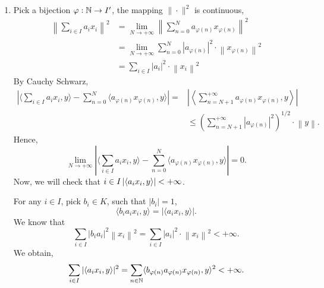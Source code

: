 \begin{proofenv}
\begin{enumerate}
        \quad Let $\psi: \NN \rightarrow I'$ be another bijection. 
        For any $N\in \NN$, there exists $M\in \NN$ such that
        $$ \{\varphi(0),\cdots \varphi(N)\}\subseteq \{\psi(0), \cdots \psi(M) \},\ M \coloneq \max\{\psi^{-1} \left(\varphi(i)\right)\}.$$
        equivalently,
        $$\{\psi(n)\mid  b\ge M + 1 \}\subseteq \{\varphi(m) \mid n\ge N + 1\}.$$
        Therefore, 
        $$ \left\| x - \sum_{n = 0}^{M} a_{\psi(n)} x_{\psi(n)}\right\|^2 = \sum_{n = M + 1}^{\infty} |a_{\psi(n)}|^2 \|x_{\psi(n)}\|^2\le \sum_{n = N + 1}^{+\infty} |a_{\varphi(n)}|^2 \|x_{\varphi(n)}\|^2,$$
        which gives
        $$ \lim_{M\rightarrow +\infty} \left\| x - \sum_{n = 0}^{M} a_{\psi(n)} x_{\psi(n)}\right\|^2 = 0.$$
        \item Pick a bijection $\varphi : \mathbb{N}\rightarrow I'$, the mapping $\|\cdot\|^2$ is continuous,
        $$ \begin{aligned}
            \left\| \sum_{i\in I} a_i x_i\right\|^2 &= \lim_{N\rightarrow +\infty} \left\| \sum_{n = 0}^{N} a_{\varphi(n)} x_{\varphi(n)}\right\|^2\\
            & = \lim_{N\rightarrow +\infty} \sum_{n = 0}^{N} \left|a_{\varphi(n)}\right|^2 \cdot \left\|x_{\varphi(n)}\right\|^2\\
            & = \sum_{i\in I} \left|a_i\right|^2 \cdot \left\|x_i\right\|^2
        \end{aligned}$$
        By Cauchy Schwarz,
        $$\begin{aligned}
            \left| \langle \sum_{i\in I} a_i x_i, y\rangle - \sum_{n=0}^{N}\langle a_{\varphi(n)} x_{\varphi(n)}, y\rangle \right| = & \left| \left\langle \sum_{n =N+1}^{+\infty} a_{\varphi(n)} x_{\varphi(n)}, y\right\rangle \right|\\
            & \le \left(\sum_{n=N+1}^{+\infty} |a_{\varphi(n)}|^2 \right)^{1/2} \cdot \left\|y\right\|.
        \end{aligned}$$
        Hence, 
        $$\lim_{N\rightarrow +\infty} \left| \langle \sum_{i\in I} a_i x_i, y\rangle - \sum_{n=0}^{N}\langle a_{\varphi(n)} x_{\varphi(n)}, y\rangle \right| = 0.$$
        Now, we will check that $\displaystyle i\in I \left| \left\langle a_i x_i, y\right\rangle\right|<+\infty $.

        \quad For any $i\in I$, pick $b_i \in K$, such that $|b_i|=1$,
        $$ \langle b_i a_i x_i, y\rangle = \left|\langle a_i x_i, y\rangle\right|.$$
        We know that 
        $$ \sum_{i\in I} |b_i a_i|^2 \left\|x_i\right\|^2 = \sum_{i\in I} \left|a_i\right|^2 \cdot \left\|x_i\right\|^2 < +\infty.$$
        We obtain,
        $$ \sum_{i\in I} |\langle a_i x_i, y\rangle|^2 = \sum_{n\in \mathbb{N}} \langle b_{\varphi(n)} a_{\varphi(n)} x_{\varphi(n)}, y\rangle^2 < +\infty.$$
    \end{enumerate}
\end{proofenv}
